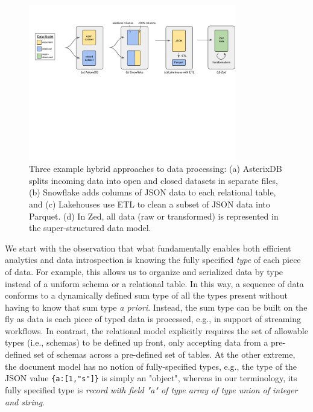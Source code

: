 \begin{figure}[t]
    \centering
    \includegraphics[width=0.81\textwidth]{figures/hybrid_approaches.pdf}
    \vspace{-1.3em}
    \caption{Three example hybrid approaches to data processing: (a) AsterixDB splits incoming data into open and closed datasets in separate files, (b) Snowflake adds columns of JSON data to each relational table, and (c) Lakehouses use ETL to clean a subset of JSON data into Parquet. (d) In Zed, all data (raw or transformed) is represented in the super-structured data model.}
    \label{f:hybrid_approaches}
    \vspace{-1.6em}
\end{figure}

We start with the observation that what fundamentally enables both efficient analytics and data introspection is knowing the fully specified {\em type} of each piece of data. For example, this allows us to organize and serialized data by type instead of a uniform schema or a relational table.  In this way, a sequence of data conforms to a dynamically defined sum type of all the types present without having to know that sum type {\em a priori}.  Instead, the sum type can be built on the fly as data is each piece of typed data is processed, e.g., in support of streaming workflows.  In contrast, the relational model explicitly requires the set of allowable types (i.e., schemas) to be defined up front, only accepting data from a pre-defined set of schemas across a pre-defined set of tables.  At the other extreme, the document model has no notion of fully-specified types, e.g., the type of the JSON value {\tt \{a:[1,"s"]\}} is simply an "object", whereas in our terminology, its fully specified type is {\em record with field "a" of type array of type union of integer and string}.

